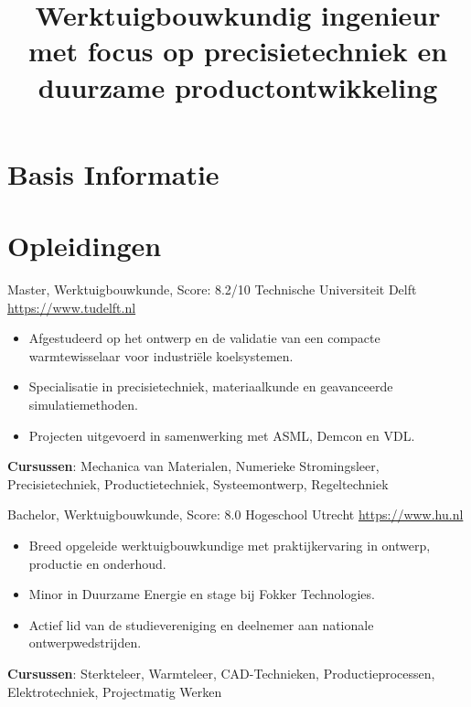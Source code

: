 \documentclass[a4paper, serif, 10pt]{moderncv}
\title{Werktuigbouwkundig ingenieur met focus op precisietechniek en duurzame productontwikkeling}
\begin{document}
\maketitle

\section{Basis Informatie}

\section{Opleidingen}

        {Master, Werktuigbouwkunde, Score: 8.2/10}
        {Technische Universiteit Delft}
        {\url{https://www.tudelft.nl}}
        {}
        {\begin{itemize}
\item Afgestudeerd op het ontwerp en de validatie van een compacte warmtewisselaar voor industriële koelsystemen.
\item Specialisatie in precisietechniek, materiaalkunde en geavanceerde simulatiemethoden.
\item Projecten uitgevoerd in samenwerking met ASML, Demcon en VDL.
\end{itemize}
\textbf{Cursussen}: Mechanica van Materialen, Numerieke Stromingsleer, Precisietechniek, Productietechniek, Systeemontwerp, Regeltechniek}

        {Bachelor, Werktuigbouwkunde, Score: 8.0}
        {Hogeschool Utrecht}
        {\url{https://www.hu.nl}}
        {}
        {\begin{itemize}
\item Breed opgeleide werktuigbouwkundige met praktijkervaring in ontwerp, productie en onderhoud.
\item Minor in Duurzame Energie en stage bij Fokker Technologies.
\item Actief lid van de studievereniging en deelnemer aan nationale ontwerpwedstrijden.
\end{itemize}
\textbf{Cursussen}: Sterkteleer, Warmteleer, CAD-Technieken, Productieprocessen, Elektrotechniek, Projectmatig Werken}
\end{document}
